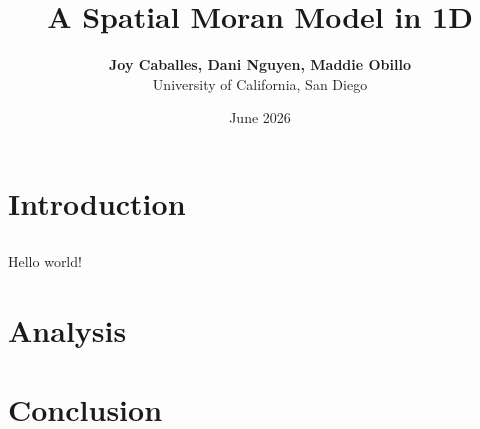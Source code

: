 \documentclass[12pt, letterpaper]{article}
\title{\textbf{A Spatial Moran Model in 1D}}
\author{\textbf{Joy Caballes, Dani Nguyen, Maddie Obillo} \\ University of California, San Diego}
\date{June 2026}
\begin{document}
\maketitle


\section{Introduction}
\subsection{}
Hello world! \cite{komarova}
\section{Analysis}
\section{Conclusion}
\printbibliography
\end{document}
